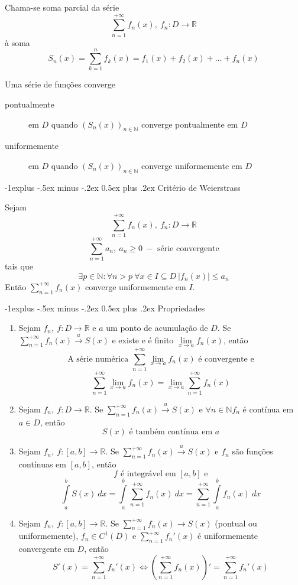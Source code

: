 \documentclass[10pt,landscape]{article}
\makeatletter
\renewcommand{\subsection}{\@startsection{subsection}{2}{0mm}%
                                {-1explus -.5ex minus -.2ex}%
                                {0.5ex plus .2ex}%
                                {\normalfont\normalsize\bfseries}}
\makeatother
\begin{document}
\begin{multicols}{3}
Chama-se soma parcial da série
$$\sum\limits_{n=1}^{+\infty} f_n(x),\ f_n: D \rightarrow \mathbb{R}$$
à soma
$$S_n(x) = \sum\limits_{k=1}^{n} f_k(x) = f_1(x) + f_2(x) + ... + f_n(x)$$

Uma série de funções converge
\begin{description}
\item[pontualmente] em $D$ quando $\left( S_n(x)\right)_{n \in \mathbb{N}}$ converge pontualmente em $D$
\item[uniformemente] em $D$ quando $\left( S_n(x)\right)_{n \in \mathbb{N}}$ converge uniformemente em $D$
\end{description}

\subsection{Critério de Weierstrass}

Sejam
$$\sum\limits_{n=1}^{+\infty} f_n(x),\ f_n: D \rightarrow \mathbb{R}$$
$$\sum\limits_{n=1}^{+\infty} a_n,\ a_n \geq 0\ - \text{ série convergente}$$
tais que
$$\exists p \in \mathbb{N}: \forall n > p\ \forall x \in I \subseteq D\ \left| f_n(x)\right| \leq a_n$$
Então $\sum\limits_{n=1}^{+\infty} f_n(x)$ converge uniformemente em $I$.

\subsection{Propriedades}

\begin{enumerate}
\item Sejam $f_n,\ f: D \rightarrow \mathbb{R}$ e $a$ um ponto de acumulação de $D$. Se $\sum\limits_{n=1}^{+\infty} f_n(x) \xrightarrow{u} S(x)$ e existe e é finito $\lim\limits_{x \to a} f_n(x)$, então
$$\text{A série numérica } \sum\limits_{n=1}^{+\infty} \lim\limits_{x \to a} f_n(x) \text{ é convergente e}$$
$$\sum\limits_{n=1}^{+\infty} \lim\limits_{x \to a} f_n(x) = \lim\limits_{x \to a}\sum\limits_{n=1}^{+\infty} f_n(x)$$
\item Sejam $f_n,\ f: D \rightarrow \mathbb{R}$. Se $\sum\limits_{n=1}^{+\infty} f_n(x) \xrightarrow{u} S(x)$ e $\forall n \in \mathbb{N} f_n$ é contínua em $a \in D$, então
$$S(x) \text{ é também contínua em } a$$
\item Sejam $f_n,\ f: [a, b] \rightarrow \mathbb{R}$. Se $\sum\limits_{n=1}^{+\infty} f_n(x) \xrightarrow{u} S(x)$ e $f_n$ são funções contínuas em $[a, b]$, então
$$f \text{ é integrável em } [a, b] \text{ e}$$
$$\int\limits_a^b S(x)\ dx = \int\limits_a^b \sum\limits_{n=1}^{+\infty} f_n(x)\ dx = \sum\limits_{n=1}^{+\infty} \int\limits_a^b f_n(x)\ dx$$
\item Sejam $f_n,\ f: [a, b] \rightarrow \mathbb{R}$. Se $\sum\limits_{n=1}^{+\infty} f_n(x) \rightarrow S(x)$ (pontual ou uniformemente), $f_n \in C^1(D)$ e $\sum\limits_{n=1}^{+\infty} f_n'(x)$ é uniformemente convergente em $D$, então
$$S'(x) = \sum\limits_{n=1}^{+\infty} f_n'(x) \Leftrightarrow \left( \sum\limits_{n=1}^{+\infty} f_n(x)\right)' = \sum\limits_{n=1}^{+\infty} f_n'(x)$$
\end{enumerate}


\end{multicols}
\end{document}
